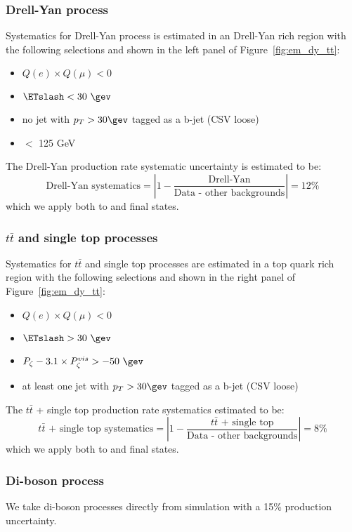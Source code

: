 \subsubsection{Drell-Yan process}\label{sec:em_DY}
Systematics for Drell-Yan process is estimated in an Drell-Yan rich 
region with the following selections and shown in the left panel of 
Figure~\ref{fig:em_dy_tt}:
\begin{itemize}
  \item $Q(e) \times Q(\mu) < 0$
  \item $\ETslash<30~\gev$
  \item no jet with $p_T>30\gev$ tagged as a b-jet (CSV loose)
  \item \meffemu $<$ 125 GeV
\end{itemize}
The Drell-Yan production rate systematic uncertainty is estimated to
be:
\begin{equation}\label{eq:DY}
\text{Drell-Yan systematics} = \left| 1 - \frac{\text{Drell-Yan}}{\text{Data - other backgrounds}}\right| = 12\%
\end{equation}
which we apply both to \tetm and \teth final states.

\subsubsection{$t\bar{t}$ and single top processes}\label{sec:em_tt}
Systematics for $t\bar{t}$ and single top processes are estimated in a
top quark rich region with the following selections and shown in the
right panel of Figure~\ref{fig:em_dy_tt}:
\begin{itemize}
  \item $Q(e) \times Q(\mu) < 0$
  \item $\ETslash>30~\gev$
  \item $P_{\zeta}- 3.1 \times P_{\zeta}^{vis} > -50~\gev$
  \item at least one jet with $p_T>30\gev$ tagged as a b-jet (CSV loose)
\end{itemize}
The $t\bar{t}$ + single top production rate systematics estimated to be:
\begin{equation}\label{eq:em_tt}
\text{$t\bar{t}$ + single top systematics} = \left| 1 - \frac{\text{$t\bar{t}$ + single top}}{\text{Data - other backgrounds}}\right| = 8\%
\end{equation}
which we apply both to \tetm and \teth final states.

\subsubsection{Di-boson process}
We take di-boson processes directly from simulation with a 15\% production uncertainty.


